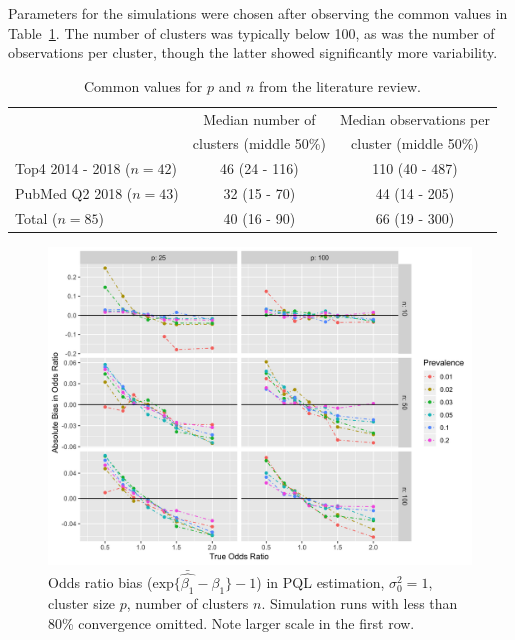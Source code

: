 \documentclass{article}
\begin{document}
\begin{flushleft}
Parameters for the simulations were chosen after observing the common values in Table~\ref{tab:lit_review_numbers}. The number of clusters was typically below 100, as was the number of observations per cluster, though the latter showed significantly more variability.

\begin{table}[]
\centering
 \begin{tabular}{ |l||c|c| } 
 \hline
      & Median number of & Median observations per \\ 
      & clusters (middle 50\%) & cluster (middle 50\%) \\ 
     \hline
    Top4 2014 - 2018 ($n=42$) & 46 (24 - 116) & 110 (40 - 487) \\ 
    PubMed Q2 2018 ($n=43$) & 32 (15 - 70) & 44 (14 - 205) \\ 
    \hline
    Total ($n=85$) & 40 (16 - 90) & 66 (19 - 300) \\
    \hline
 \end{tabular}
    \caption{Common values for $p$ and $n$ from the literature review.}
    \label{tab:lit_review_numbers}
\end{table}



\begin{figure}[]
\begin{center}
\includegraphics[width=\textwidth]{_bias_pql_sbs1.png}
  \caption{Odds ratio bias ($\text{exp} \{ \bar{\hat{\beta_1}} - \beta_1 \}-1$) in PQL estimation, $\sigma^2_0=1$, cluster size $p$, number of clusters $n$. Simulation runs with less than 80\% convergence omitted. Note larger scale in the first row.}
    \label{fig:_bias_pql_6}
\end{center}
\end{figure}


\end{flushleft}
\end{document}
